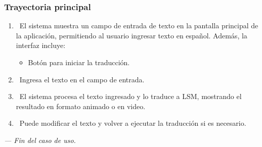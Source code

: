 \subsubsection{Trayectoria principal}
\begin{enumerate}[label=\textbf{\arabic*}, leftmargin=1.5cm]
    \item \UCsystem \ El sistema muestra un campo de entrada de texto en la pantalla principal de la aplicación, permitiendo al usuario ingresar texto en español.  
    Además, la interfaz incluye:  
    \begin{itemize}
        \item Botón para iniciar la traducción.
    \end{itemize}

    \item \UCactor \ Ingresa el texto en el campo de entrada.  
   
    \item \UCsystem \ El sistema procesa el texto ingresado y lo traduce a LSM, mostrando el resultado en formato animado o en video.

    \item \UCactor \ Puede modificar el texto y volver a ejecutar la traducción si es necesario.

\end{enumerate}

\textit{--- Fin del caso de uso.}

    
